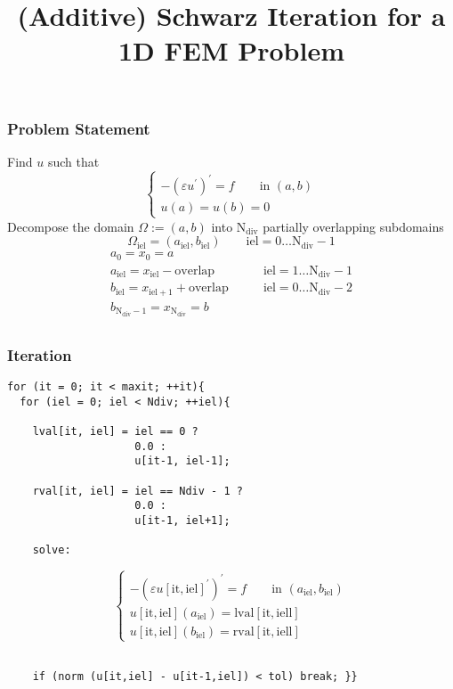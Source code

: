 \documentclass[smaller,a4paper]{beamer}
\begin{document}
\title{(Additive) Schwarz Iteration for a 1D FEM Problem}
\frame{\titlepage}

\begin{frame}\frametitle{Problem Statement}

Find $u$ such that
$$
\left\{
\begin{array}{l}
- \left( \varepsilon u ^{\prime} \right) ^{\prime} = f \qquad \mbox{in } (a, b) \\[3mm]
u(a) = u(b) = 0 
\end{array}
\right.
$$
Decompose the domain $\Omega := (a, b)$ into $\mathrm{N}_{\mathrm{div}}$ partially overlapping subdomains 
$$\Omega_{\mathrm{iel}} = (a_{\mathrm{iel}}, b_{\mathrm{iel}}) \qquad \mathrm{iel} = 0\ldots \mathrm{N}_{\mathrm{div}} - 1$$
%
$$
\begin{array}{lr}
a_{0} = x_{0} = a\\
a_{\mathrm{iel}} = x_{\mathrm{iel}} - \mathrm{overlap} 
\qquad &\mathrm{iel} = 1\ldots \mathrm{N}_{\mathrm{div}} - 1\\
b_{\mathrm{iel}} = x_{\mathrm{iel+1}} + \mathrm{overlap} 
\qquad & \mathrm{iel} = 0\ldots \mathrm{N}_{\mathrm{div}} - 2\\
b_{\mathrm{N}_{\mathrm{div}} - 1} = x_{\mathrm{N}_{\mathrm{div}}} = b\\
\end{array}
$$
\end{frame}


\begin{frame}[fragile]\frametitle{Iteration}
\begin{lstlisting}
for (it = 0; it < maxit; ++it){
  for (iel = 0; iel < Ndiv; ++iel){

    lval[it, iel] = iel == 0 ? 
                    0.0 : 
                    u[it-1, iel-1];
                    
    rval[it, iel] = iel == Ndiv - 1 ? 
                    0.0 : 
                    u[it-1, iel+1];
                    
    solve:
\end{lstlisting}
    $$
    \left\{
    \begin{array}{l}
    - \left( \varepsilon u[\mathrm{it},\mathrm{iel}] ^{\prime} \right) ^{\prime} = f 
    \qquad \mbox{in } (a_{\mathrm{iel}}, b_{\mathrm{iel}}) \\[3mm]
    u[\mathrm{it},\mathrm{iel}](a_{\mathrm{iel}}) = \mathrm{lval}[\mathrm{it},\mathrm{iell}]\\[3mm] 
    u[\mathrm{it},\mathrm{iel}](b_{\mathrm{iel}}) = \mathrm{rval}[\mathrm{it},\mathrm{iell}]
    \end{array}
    \right.
    $$

\begin{lstlisting}
                    
    if (norm (u[it,iel] - u[it-1,iel]) < tol) break; }}
\end{lstlisting}
\end{frame}
\end{document}
